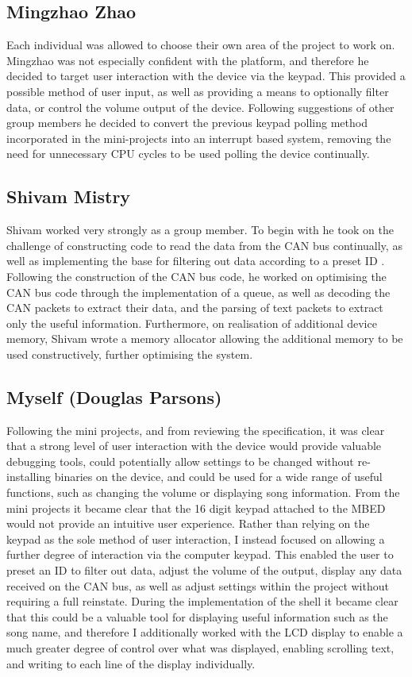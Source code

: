\subsection*{Mingzhao Zhao}
Each individual was allowed to choose their own area of the project to work on. 
Mingzhao was not especially confident with the platform, and therefore he 
decided to target user interaction with the device via the keypad. This 
provided a possible method of user input, as well as providing a means to 
optionally filter data, or control the volume output of the device. 
Following suggestions 
of other group members he decided to convert the previous keypad polling method 
incorporated in the mini-projects into an interrupt based system, removing the 
need for unnecessary CPU cycles to be used polling the device continually. 

\subsection*{Shivam Mistry} 
Shivam worked very strongly as a group member. To begin with he took on the 
challenge of constructing code to read the data from the CAN bus continually, 
as well as implementing the base for filtering out data according to a preset ID
. Following the construction of the CAN bus code, he worked on optimising the 
CAN bus code through the
implementation of a queue, as well as decoding the CAN packets to extract their
data, and the parsing of text packets to extract only the useful information. 
Furthermore, on realisation of additional device memory, Shivam wrote a memory 
allocator allowing the additional memory to be used constructively, further 
optimising the system. 

\subsection*{Myself (Douglas Parsons)}
Following the mini projects, and from reviewing the specification, it was clear 
that a strong level of user interaction with the device would provide valuable 
debugging tools, could potentially allow settings to be changed without 
re-installing binaries on the device, and could be used for a wide range of 
useful functions, such as changing the volume or displaying song information. 
From the mini projects it became clear that the 16 digit keypad attached to the 
MBED would not provide an intuitive user experience. Rather than relying on 
the keypad as the sole method of user interaction, I instead focused 
on allowing a further degree of interaction via the computer keypad. This 
enabled the user to preset an ID to filter out data, adjust the volume of the 
output, display any data received on the CAN bus, as 
well as adjust settings within the project without requiring a full reinstate.
During the implementation of the shell it became clear that this could be a 
valuable tool for displaying useful information such as the song name, and 
therefore I additionally worked with the LCD display to enable a much greater 
degree of control over what was displayed, enabling scrolling text, and writing 
to each line of the display individually.

